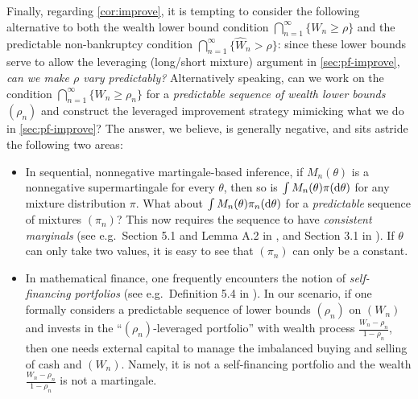 Finally, regarding \cref{cor:improve}, it is tempting to consider the following alternative to both the wealth lower bound condition $\bigcap_{n=1}^\infty\{ W_n \ge \rho \}$ and the predictable non-bankruptcy condition $\bigcap_{n=1}^\infty \{ \widehat W_n > \rho \}$: since these lower bounds serve to allow the leveraging (long/short mixture) argument in \cref{sec:pf-improve}, \emph{can we make $\rho$ vary predictably?} Alternatively speaking, can we work on the condition $\bigcap_{n=1}^\infty\{ W_n \ge \rho_n \}$ for a \emph{predictable sequence of wealth lower bounds $(\rho_n)$} and construct the leveraged improvement strategy mimicking what we do in \cref{sec:pf-improve}? The answer, we believe, is generally negative, and sits astride the following two areas: 
\begin{itemize}
    \item In sequential, nonnegative martingale-based inference, if $M_n(\theta)$ is a nonnegative supermartingale for every $\theta$, then so is $\int M_n(\theta) \pi(\mathrm{d} \theta)$ for any mixture distribution $\pi$. What about $\int M_n(\theta) \pi_n(\mathrm{d} \theta)$ for a \emph{predictable} sequence of mixtures $(\pi_n)$? This now requires the sequence to have \emph{consistent marginals} (see e.g.\ Section 5.1 and Lemma A.2 in \cite{flynn2023improved}, and Section 3.1 in \cite{akhavan2025bernstein}). If $\theta$ can only take two values, it is easy to see that $(\pi_n)$ can only be a constant. 
    \item In mathematical finance, one frequently encounters the notion of \emph{self-financing portfolios} (see e.g.\ Definition 5.4 in \cite{FollmerSchied+2025}). In our scenario, if one formally considers a predictable sequence of lower bounds $(\rho_n)$ on $(W_n)$ and invests in the ``$(\rho_n)$-leveraged portfolio'' with wealth process $\frac{W_n-\rho_n}{1-\rho_n}$, then one needs external capital to manage the imbalanced buying and selling of cash and $(W_n)$.
    Namely, it is not a self-financing portfolio and the wealth $\frac{W_n-\rho_n}{1-\rho_n}$ is not a martingale.
\end{itemize}

